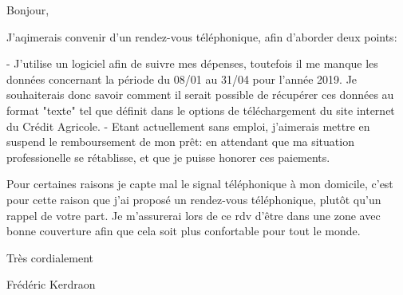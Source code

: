 Bonjour,

J'aqimerais convenir d'un rendez-vous téléphonique, afin d'aborder deux points:

- J'utilise un logiciel afin de suivre mes dépenses, toutefois il me manque les données concernant la période du 08/01 au 31/04 pour l'année 2019.
Je souhaiterais donc savoir comment il serait possible de récupérer ces données au format "texte" tel que définit dans le options de téléchargement du site internet du Crédit Agricole.
- Etant actuellement sans emploi, j'aimerais mettre en suspend le remboursement de mon prêt: en attendant que ma situation professionelle se rétablisse, et que je puisse honorer ces paiements.

Pour certaines raisons je capte mal le signal téléphonique à mon domicile, c'est pour cette raison que j'ai proposé un rendez-vous téléphonique, plutôt qu'un rappel de votre part. Je m'assurerai lors de ce rdv d'être dans une zone avec bonne couverture afin que cela soit plus confortable pour tout le monde.

Très cordialement

Frédéric Kerdraon 

